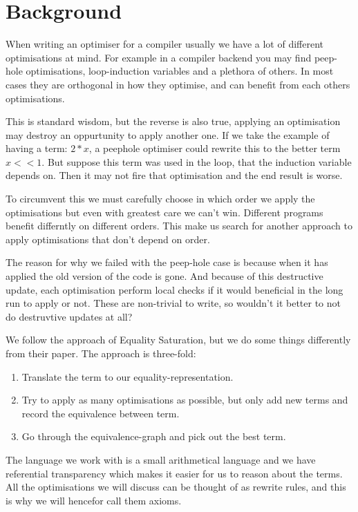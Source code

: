 
\section{Background}
When writing an optimiser for a compiler usually we have a lot of different 
optimisations at mind. For example in a compiler backend you may find peep-hole\cite{peephole}
optimisations, loop-induction variables\cite{loop-induction} and a plethora of others. In most cases 
they are orthogonal in how they optimise, and can benefit from each others optimisations.

This is standard wisdom, but the reverse is also true, applying an optimisation
may destroy an oppurtunity to apply another one. If we take the example of having a 
term: $ 2 * x $, a peephole optimiser could rewrite this to the better term 
$ x << 1$. But suppose this term was used in the loop, that the induction variable
depends on. Then it may not fire that optimisation and the end result is worse.

To circumvent this we must carefully choose in which order we apply the optimisations
but even with greatest care we can't win. Different programs benefit differntly
on different orders. This make us search for another approach to apply optimisations
that don't depend on order. 

The reason for why we failed with the peep-hole case is because when it has applied
the old version of the code is gone. And because of this destructive update, each
optimisation perform local checks if it would beneficial in the long run to apply
or not. These are non-trivial to write, so wouldn't it better to not do destruvtive
updates at all?

We follow the approach of Equality Saturation\cite{eqSat}, but we do some things
differently from their paper. The approach is three-fold:

\begin{enumerate}
  \item Translate the term to our equality-representation.
  \item Try to apply as many optimisations as possible, but only add new terms and
        record the equivalence between term.
  \item Go through the equivalence-graph and pick out the best term.
\end{enumerate}

The language we work with is a small arithmetical language and we have referential
transparency which makes it easier for us to reason about the terms. All the optimisations
we will discuss can be thought of as rewrite rules, and this is why we will hencefor
call them axioms.


